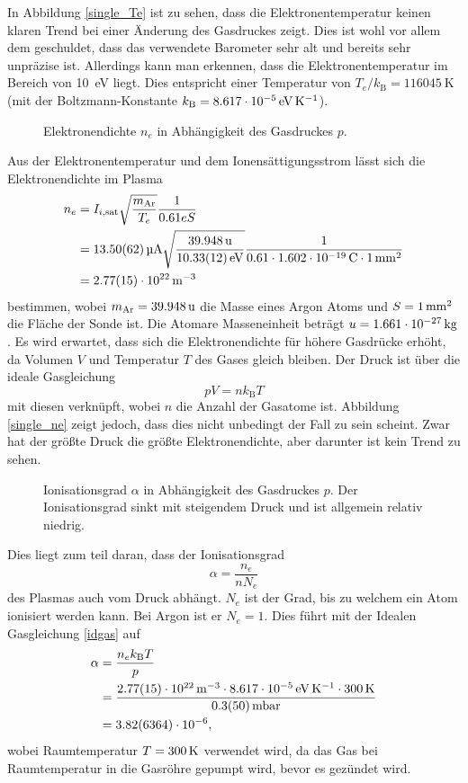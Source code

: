 In Abbildung \vref{single_Te} ist zu sehen, dass die Elektronentemperatur keinen klaren Trend bei einer \"Anderung des Gasdruckes zeigt.
Dies ist wohl vor allem dem geschuldet, dass das verwendete Barometer sehr alt und bereits sehr unpr\"azise ist.
Allerdings kann man erkennen, dass die Elektronentemperatur im Bereich von \SI{10}{\electronvolt} liegt.
Dies entspricht einer Temperatur von $T_e/k_\text{B}=\SI{116045}{\kelvin}$ (mit der Boltzmann-Konstante $k_\text{B}=\SI{8.617e-5}{\electronvolt\per\kelvin}$).

\begin{figure}[htbp]
    \centering
    
    \caption{
        Elektronendichte $n_e$ in Abh\"angigkeit des Gasdruckes $p$.
    }
    \label{single_ne}
\end{figure}
Aus der Elektronentemperatur und dem Ionens\"attigungsstrom l\"asst sich die Elektronendichte im Plasma
\begin{align}
n_e
    &=I_{i,\text{sat}}\sqrt{\frac{m_\text{Ar}}{T_e}}\frac{1}{0.61eS}\label{sne}\\
    &=\siAIisata\sqrt{\frac{\simAr}{\siATea}}\frac{1}{0.61\cdot \sie \cdot\siS}\nonumber\\
    &=\siAnea\nonumber
\end{align}
bestimmen, wobei $m_\text{Ar}=\simAr$ die Masse eines Argon Atoms und $S=\SI{1}{\milli\metre\squared}$ die Fl\"ache der Sonde ist.
Die Atomare Masseneinheit betr\"agt $u=\SI{1.661e-27}{\kilo\gram}$.
Es wird erwartet, dass sich die Elektronendichte f\"ur h\"ohere Gasdr\"ucke erh\"oht, da Volumen $V$ und Temperatur $T$ des Gases gleich bleiben.
Der Druck ist \"uber die ideale Gasgleichung
\begin{equation}
pV = nk_\text{B}T\label{idgas}
\end{equation}
mit diesen verkn\"upft, wobei $n$ die Anzahl der Gasatome ist.
Abbildung \vref{single_ne} zeigt jedoch, dass dies nicht unbedingt der Fall zu sein scheint.
Zwar hat der gr\"o\ss te Druck die gr\"o\ss te Elektronendichte, aber darunter ist kein Trend zu sehen.

\begin{figure}[htbp]
    \centering
    
    \caption{
        Ionisationsgrad $\alpha$ in Abh\"angigkeit des Gasdruckes $p$.
        Der Ionisationsgrad sinkt mit steigendem Druck und ist allgemein relativ niedrig.
    }
    \label{single_alpha}
\end{figure}

Dies liegt zum teil daran, dass der Ionisationsgrad
\begin{equation}
\alpha=\frac{n_e}{n N_e}\label{defalpha}
\end{equation}
des Plasmas auch vom Druck abh\"angt.
$N_e$ ist der Grad, bis zu welchem ein Atom ionisiert werden kann.
Bei Argon ist er $N_e=1$.
Dies f\"uhrt mit der Idealen Gasgleichung \vref{idgas} auf
\begin{align}
\alpha
    &= \frac{n_e k_\text{B} T}{p}\label{salpha}\\
    &= \frac{\siAnea\cdot\sik\cdot\siTroom}{\siApa}\nonumber\\
    &= \siAalphaa\nonumber,
\end{align}
wobei Raumtemperatur $T=\SI{300}{\kelvin}$ verwendet wird, da das Gas bei Raumtemperatur in die Gasr\"ohre gepumpt wird, bevor es gez\"undet wird.

